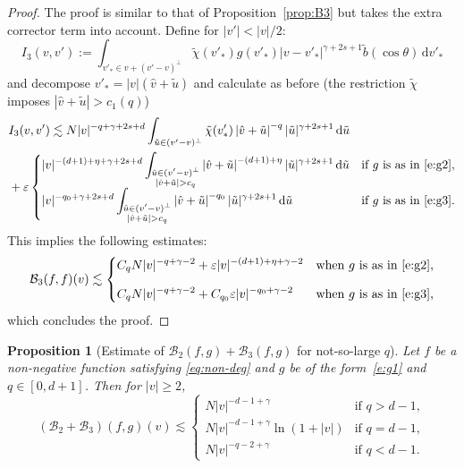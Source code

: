 \documentclass[11pt]{article}
\theoremstyle{plain}
\newtheorem{prop}[thm]{Proposition}
\theoremstyle{definition}
\numberwithin{equation}{section}
\newcommand{\eps}{\varepsilon}
\newcommand{\dd} {\, \mathrm{d}}
\let\A N
\begin{document}
\begin{proof}
The proof is similar to that of Proposition~\ref{prop:B3} but takes
the extra corrector term into account. Define for $|v'| < |v|/2$:
\begin{equation*}
I_3(v,v') := \int_{v'_* \in v + (v'-v)^\bot} \tilde \chi(v'_*) g(v'_*)
|v-v'_*|^{\gamma+2s+1} \tilde b(\cos \theta) \dd v'_*
\end{equation*}
and decompose $v'_* = |v| (\hat v + \tilde u)$ and calculate as before
(the restriction $\tilde \chi$ imposes $|\hat v + \tilde u| > c_1(q)$)
\begin{align*}
& I_3(v,v')
\lesssim \A |v|^{-q+ \gamma +2s+d} \int_{\tilde u \in (v'-v)^\bot}
\tilde \chi(v'_*) \left|\hat v + \tilde u \right|^{-q}
|\tilde u|^{\gamma+2s +1} \dd \tilde u \\
& + \eps \begin{cases} \displaystyle
|v|^{-(d+1)+\eta + \gamma +2s+d} \int_{\substack{\tilde u \in
(v'-v)^\bot\\\left|\hat v + \tilde u \right| > c_q}}
\left|\hat v + \tilde u \right|^{-(d+1)+\eta} |\tilde u|^{\gamma+2s
+1} \dd \tilde u & \text{if $g$ is as in \eqref{e:g2},} \\[3mm] \displaystyle
|v|^{-q_0 + \gamma +2s+d} \int_{\substack{\tilde u \in
(v'-v)^\bot\\\left|\hat v + \tilde u \right| > c_q}}
\left|\hat v + \tilde u \right|^{-q_0} |\tilde u|^{\gamma+2s +1} \dd
\tilde u & \text{if $g$ is as in \eqref{e:g3}.}
\end{cases}
\end{align*}
This implies the following estimates:
\begin{align*}
\mathcal{B}_3 (f,f)(v) \lesssim \begin{cases}\displaystyle
C_q \A |v|^{-q+\gamma-2} + \eps |v|^{-(d+1)+\eta + \gamma -2}
& \text{when $g$ is as in \eqref{e:g2},}\\[3mm] \displaystyle
C_q \A |v|^{-q+\gamma-2} + C_{q_0} \eps |v|^{-q_0 + \gamma -2} & \text{when $g$ is as in \eqref{e:g3},}
\end{cases}
\end{align*}
which concludes the proof.
\end{proof}

\begin{prop}[Estimate of {$\mathcal{B}_2(f,g) + \mathcal{B}_3(f,g)$} for
not-so-large $q$]\label{prop:B23-2}
Let $f$ be a non-negative function satisfying \eqref{eq:non-deg} and
$g$ be of the form~\eqref{e:g1} and $q \in [0,d+1]$. Then for $|v| \ge 2$,
\[ (\mathcal{B}_2 + \mathcal{B}_3)(f,g)(v) \lesssim \begin{cases}
\A |v|^{-d-1+\gamma} & \text{if } q > d-1,\\
\A |v|^{-d-1+\gamma} \ln (1+|v|) & \text{if } q = d-1,\\
\A |v|^{-q-2+\gamma} & \text{if } q < d-1.
\end{cases}
\]
\end{prop}
\end{document}
